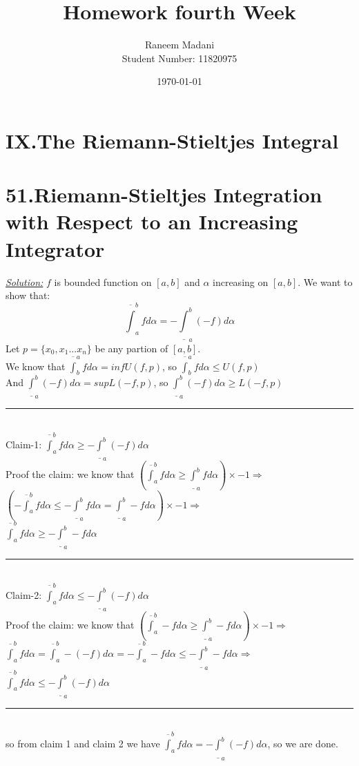 \documentclass{article}
\title{\Huge Homework fourth Week}
\author{\huge Raneem Madani\\ Student Number: 11820975 }
\date{\today}
\begin{document}
\maketitle
\section*{\huge{IX.The Riemann-Stieltjes Integral}}
\section*{51.Riemann-Stieltjes Integration with Respect to an
Increasing Integrator}
\begin{tcolorbox}[enhanced,attach boxed title to top center={yshift=-3mm,yshifttext=-1mm},
  colback=blue!5!white,colframe=blue!75!black,colbacktitle=red!80!black,
  title=Exercise 5:.,fonttitle=\bfseries,
  boxed title style={size=small,colframe=red!50!black} ]
  \textit{\underline {\color{blue}Solution:}}
$f$ is bounded function on $[a,b]$ and $\alpha$ increasing on $[a,b]$. We want to show that:
$$\overline{\int}_a^b f d\alpha=-\underline{\int}_a^b (-f)d\alpha$$
Let $p=\{x_0,x_1...x_n\}$ be any partion of $[a,b]$.\\
We know that $\overline{\int}^a_b f d\alpha=inf U(f,p)$, so $\overline{\int}^a_b f d\alpha \leq U(f,p)$\\
And $\underline{\int}_a^b (-f)d\alpha=sup L(-f,p)$, so $\underline{\int}_a^b (-f)d\alpha\geq L(-f,p)$\\
\noindent\rule{8cm}{0.4pt}\\
{\color{red}Claim-1:} $\overline{\int}_a^b f d\alpha\geq -\underline{\int}_a^b (-f)d\alpha$\\
{\color{red}Proof the claim:} we know that $\left( \overline{\int}_a^b f d\alpha\geq\underline{\int}_a^b fd\alpha\right)\times -1\Rightarrow$\\
$\left( -\overline{\int}_a^b f d\alpha\leq-\underline{\int}_a^b fd\alpha=\underline{\int}_a^b -fd\alpha\right)\times -1\Rightarrow$\\
 $\overline{\int}_a^b f d\alpha\geq-\underline{\int}_a^b -fd\alpha$\\
 \noindent\rule{8cm}{0.4pt}\\
 {\color{red}Claim-2:} $\overline{\int}_a^b f d\alpha\leq -\underline{\int}_a^b (-f)d\alpha$\\
{\color{red}Proof the claim:} we know that $\left( \overline{\int}_a^b -f d\alpha\geq\underline{\int}_a^b -fd\alpha\right)\times -1\Rightarrow$\\
 $\overline{\int}_a^b f d\alpha =\overline{\int}_a^b -(-f) d\alpha=-\overline{\int}_a^b -f d\alpha\leq-\underline{\int}_a^b -fd\alpha\Rightarrow$\\
  $\overline{\int}_a^b f d\alpha\leq -\underline{\int}_a^b (-f)d\alpha$\\
 \noindent\rule{8cm}{0.4pt}\\
 so from claim 1 and claim 2 we have $\overline{\int}_a^b f d\alpha=-\underline{\int}_a^b (-f)d\alpha$, so we are done.
\end{tcolorbox}
\end{document}
